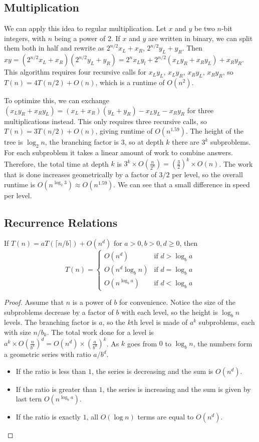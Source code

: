 \subsection{Multiplication}
We can apply this idea to regular multiplication. Let $x$ and $y$ be two $n$-bit integers, with $n$ being a power of $2$. If $x$ and $y$ are written in binary, we can split them both in half and rewrite as $2^{n/2}x_L + x_R$, $2^{n/2}y_L + y_R$. Then $xy = (2^{n/2}x_L + x_R)(2^{n/2}y_L + y_R) = 2^n x_L y_l + 2^{n/2}(x_L y_R + x_R y_L) + x_R y_R$. This algorithm requires four recursive calls for $x_L y_L$, $x_L y_R$, $x_R y_L$, $x_R y_R$, so $T(n) = 4T(n/2) + O(n)$, which is a runtime of $O(n^2)$. \par
To optimize this, we can exchange $(x_L y_R + x_R y_L) = (x_L + x_R)(y_L + y_R) - x_L y_L - x_R y_R$ for three multiplications instead. This only requires three recursive calls, so $T(n) = 3T(n/2) + O(n)$, giving runtime of $O(n^{1.59})$. The height of the tree is $\log_2 n$, the branching factor is $3$, so at depth $k$ there are $3^k$ subproblems. For each subproblem it takes a linear amount of work to combine answers. Therefore, the total time at depth $k$ is $3^k \times O(\frac{n}{2^k}) = (\frac{3}{2})^k \times O(n)$. The work that is done increases geometrically by a factor of $3/2$ per level, so the overall runtime is $O(n^{\log_2 3}) \approx O(n^{1.59})$. We can see that a small difference in speed per level.

\subsection{Recurrence Relations}
\begin{thm}
  If $T(n) = aT(\lceil n/b \rceil) + O(n^d)$ for $a>0, b>0, d \geq 0$, then
$$T(n) =
\begin{cases}
  O(n^d) & \text{if $d > \log_b a$} \\
  O(n^d \log_b n) & \text{if $d = \log_b a$} \\
  O(n^{\log_b a}) & \text{if $d < \log_b a$}
\end{cases}$$
\end{thm}
\begin{proof}
Assume that $n$ is a power of $b$ for convenience. Notice the size of the subproblems decrease by a factor of $b$ with each level, so the height is $\log_b n$ levels. The branching factor is $a$, so the $k$th level is made of $a^k$ subproblems, each with size $n/b_k$. The total work done for a level is $a^k \times O(\frac{n}{b^k})^d = O(n^d) \times (\frac{a}{b^d})^k$. As $k$ goes from $0$ to $\log_b n$, the numbers form a geometric series with ratio $a/b^d$.
\begin{itemize}
	\item If the ratio is less than $1$, the series is decreasing and the sum is $O(n^d)$.
	\item If the ratio is greater than $1$, the series is increasing and the sum is given by last tern $O(n^{\log_b a})$.
	\item If the ratio is exactly $1$, all $O(\log n)$ terms are equal to $O(n^d)$.
\end{itemize}
\end{proof}

